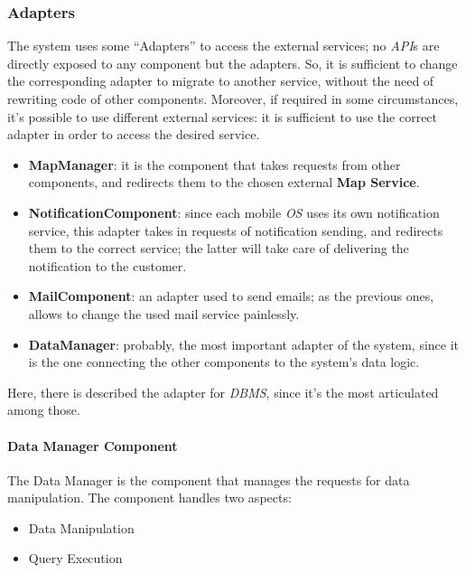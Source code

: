 \documentclass{article}
\begin{document}
		\subsubsection{Adapters}
		The system uses some “Adapters” to access the external services; no \emph{API}s are directly exposed to any component but the adapters. So, it is sufficient to change the corresponding adapter to migrate to another service, without the need of rewriting code of other components. Moreover, if required in some circumstances, it’s possible to use different external services: it is sufficient to use the correct adapter in order to access the desired service.
		
		\begin{itemize}
			\item {\bfseries MapManager}: it is the component that takes requests from other components, and redirects them to the chosen external {\bfseries Map Service}.
			
			\item {\bfseries NotificationComponent}: since each mobile \emph{OS} uses its own notification service, this adapter takes in requests of notification sending, and redirects them to the correct service; the latter will take care of delivering the notification to the customer.
			
			\item {\bfseries MailComponent}: an adapter used to send emails; as the previous ones, allows to change the used mail service painlessly.
			
			\item {\bfseries DataManager}: probably, the most important adapter of the system, since it is the one connecting the other components to the system’s data logic. 
		\end{itemize}
		
		
		Here, there is described the adapter for \emph{DBMS}, since it’s the most articulated among those.
		
			\paragraph{Data Manager Component}
				The Data Manager is the component that manages the requests for data manipulation. The component handles two aspects:
				
				\begin{itemize}
					\item Data Manipulation
					\item Query Execution
				\end{itemize}
			
\end{document}

